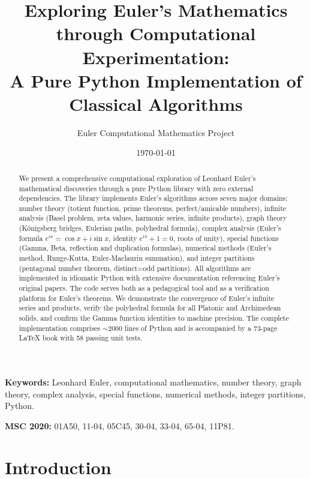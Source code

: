 \documentclass[11pt,a4paper]{article}
\title{Exploring Euler's Mathematics through Computational Experimentation:\\
A Pure Python Implementation of Classical Algorithms}
\author[1]{Euler Computational Mathematics Project}
\affil[1]{\small\href{https://github.com/euler-mathematics}{https://github.com/euler-mathematics}}
\date{\today}
\theoremstyle{definition}
\begin{document}
\maketitle

\begin{abstract}
We present a comprehensive computational exploration of Leonhard Euler's mathematical discoveries through a pure Python library with zero external dependencies. The library implements Euler's algorithms across seven major domains: number theory (totient function, prime theorems, perfect/amicable numbers), infinite analysis (Basel problem, zeta values, harmonic series, infinite products), graph theory (K\"onigsberg bridges, Eulerian paths, polyhedral formula), complex analysis (Euler's formula $e^{ix}=\cos x+i\sin x$, identity $e^{i\pi}+1=0$, roots of unity), special functions (Gamma, Beta, reflection and duplication formulas), numerical methods (Euler's method, Runge-Kutta, Euler-Maclaurin summation), and integer partitions (pentagonal number theorem, distinct=odd partitions). All algorithms are implemented in idiomatic Python with extensive documentation referencing Euler's original papers. The code serves both as a pedagogical tool and as a verification platform for Euler's theorems. We demonstrate the convergence of Euler's infinite series and products, verify the polyhedral formula for all Platonic and Archimedean solids, and confirm the Gamma function identities to machine precision. The complete implementation comprises $\sim$2000 lines of Python and is accompanied by a 73-page LaTeX book with 58 passing unit tests.
\end{abstract}

\noindent\textbf{Keywords:} Leonhard Euler, computational mathematics, number theory, graph theory, complex analysis, special functions, numerical methods, integer partitions, Python.

\noindent\textbf{MSC 2020:} 01A50, 11-04, 05C45, 30-04, 33-04, 65-04, 11P81.

\section{Introduction}
\label{sec:introduction}
\end{document}
